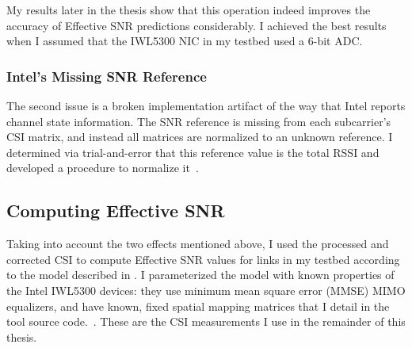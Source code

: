 My results later in the thesis show that this operation indeed improves the accuracy of Effective SNR predictions considerably. I achieved the best results when I assumed that the IWL5300 NIC in my testbed used a 6-bit ADC.

%
%

\subsubsection{Intel's Missing SNR Reference}
The second issue is a broken implementation artifact of the way that Intel reports channel state information. The SNR reference is missing from each subcarrier's CSI matrix, and instead all matrices are normalized to an unknown reference. I determined via trial-and-error that this reference value is the total RSSI and developed a procedure to normalize it~\cite[\texttt{matlab/get\_scaled\_csi.m}]{csitool_code}.

\subsection{Computing Effective SNR}
Taking into account the two effects mentioned above, I used the processed and corrected CSI to compute Effective SNR values for links in my testbed according to the model described in . I parameterized the model with known properties of the Intel IWL5300 devices: they use minimum mean square error (MMSE) MIMO equalizers, and have known, fixed spatial mapping matrices that I detail in the tool source code.~\cite[\texttt{matlab/sm\_matrices.m}]{csitool_code}. These are the CSI measurements I use in the remainder of this thesis.

